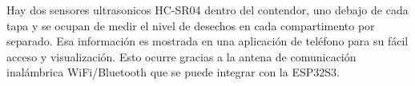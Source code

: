 Hay dos sensores ultrasonicos HC-SR04 dentro del contendor, uno debajo de cada tapa y se ocupan de medir el nivel de desechos en cada compartimento por separado. Esa información es mostrada en una aplicación de teléfono para su fácil acceso y visualización. Esto ocurre gracias a la antena de comunicación inalámbrica WiFi/Bluetooth que se puede integrar con la ESP32S3.